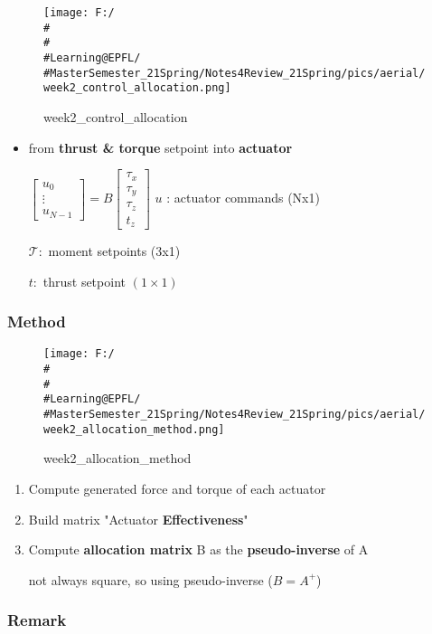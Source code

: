 \documentclass[]{article}
\begin{document}
\begin{figure}
\centering
\texttt{[image: F:/\\\#\\\#\\\#Learning@EPFL/\\\#MasterSemester\_21Spring/Notes4Review\_21Spring/pics/aerial/week2\_control\_allocation.png]}
\caption{week2\_control\_allocation}
\end{figure}

\begin{itemize}
\item
  from \textbf{thrust \& torque} setpoint into \textbf{actuator}

  \(\left[\begin{array}{c}u_{0} \\ \vdots \\ u_{N-1}\end{array}\right]=B\left[\begin{array}{l}\tau_{x} \\ \tau_{y} \\ \tau_{z} \\ t_{z}\end{array}\right]\)
  \(u\) : actuator commands (Nx1)

  \(\mathcal{T}:\) moment setpoints (3x1)

  \(t:\) thrust setpoint \((1 \times 1)\)
\end{itemize}

\subsubsection{Method}\label{header-n627}

\begin{figure}
\centering
\texttt{[image: F:/\\\#\\\#\\\#Learning@EPFL/\\\#MasterSemester\_21Spring/Notes4Review\_21Spring/pics/aerial/week2\_allocation\_method.png]}
\caption{week2\_allocation\_method}
\end{figure}

\begin{enumerate}
\def\labelenumi{\arabic{enumi}.}
\item
  Compute generated force and torque of each actuator
\item
  Build matrix "Actuator \textbf{Effectiveness}"
\item
  Compute \textbf{allocation matrix} B as the \textbf{pseudo-inverse} of
  A

  not always square, so using pseudo-inverse (\(B = A^+\))
\end{enumerate}

\subsubsection{Remark}\label{header-n637}
\end{document}

